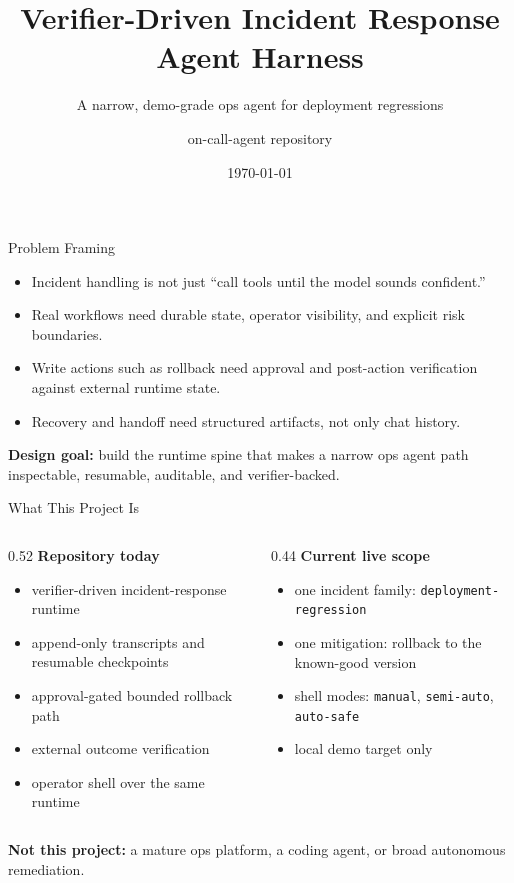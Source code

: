 \documentclass[aspectratio=169]{beamer}
\title{Verifier-Driven Incident Response Agent Harness}
\subtitle{A narrow, demo-grade ops agent for deployment regressions}
\author{on-call-agent repository}
\date{\today}
\begin{document}
\begin{frame}
  \titlepage
\end{frame}

\begin{frame}{Problem Framing}
  \begin{itemize}
    \item Incident handling is not just ``call tools until the model sounds confident.''
    \item Real workflows need durable state, operator visibility, and explicit risk boundaries.
    \item Write actions such as rollback need approval and post-action verification against external
      runtime state.
    \item Recovery and handoff need structured artifacts, not only chat history.
  \end{itemize}

  \vspace{0.5em}
  \textbf{Design goal:} build the runtime spine that makes a narrow ops agent path inspectable,
  resumable, auditable, and verifier-backed.
\end{frame}

\begin{frame}{What This Project Is}
  \begin{columns}[T]
    \begin{column}{0.52\textwidth}
      \textbf{Repository today}
      \begin{itemize}
        \item verifier-driven incident-response runtime
        \item append-only transcripts and resumable checkpoints
        \item approval-gated bounded rollback path
        \item external outcome verification
        \item operator shell over the same runtime
      \end{itemize}
    \end{column}
    \begin{column}{0.44\textwidth}
      \textbf{Current live scope}
      \begin{itemize}
        \item one incident family: \texttt{deployment-regression}
        \item one mitigation: rollback to the known-good version
        \item shell modes:
          \texttt{manual}, \texttt{semi-auto}, \texttt{auto-safe}
        \item local demo target only
      \end{itemize}
    \end{column}
  \end{columns}

  \vspace{0.75em}
  \textbf{Not this project:} a mature ops platform, a coding agent, or broad autonomous
  remediation.
\end{frame}
\end{document}
